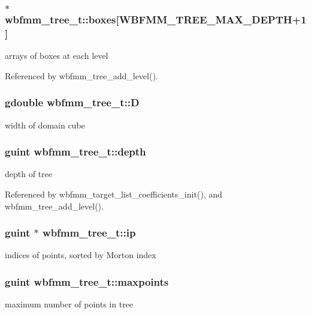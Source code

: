 \subsubsection[{boxes}]{$\ast$ wbfmm\+\_\+tree\+\_\+t\+::boxes[W\+B\+F\+M\+M\+\_\+\+T\+R\+E\+E\+\_\+\+M\+A\+X\+\_\+\+D\+E\+P\+T\+H+1]}\label{structwbfmm__tree__t_a2cec33cf396af727261fdb357e2a4de2}
arrays of boxes at each level 

Referenced by wbfmm\+\_\+tree\+\_\+add\+\_\+level().

\subsubsection[{D}]{\setlength{\rightskip}{0pt plus 5cm}gdouble wbfmm\+\_\+tree\+\_\+t\+::\+D}\label{structwbfmm__tree__t_a3f8ee26d3fe9c69bb5ba7583711c2175}
width of domain cube 
\subsubsection[{depth}]{\setlength{\rightskip}{0pt plus 5cm}guint wbfmm\+\_\+tree\+\_\+t\+::depth}\label{structwbfmm__tree__t_ad6a069db29489d75083169ca0bca9901}
depth of tree 

Referenced by wbfmm\+\_\+target\+\_\+list\+\_\+coefficients\+\_\+init(), and wbfmm\+\_\+tree\+\_\+add\+\_\+level().

\subsubsection[{ip}]{\setlength{\rightskip}{0pt plus 5cm}guint $\ast$ wbfmm\+\_\+tree\+\_\+t\+::ip}\label{structwbfmm__tree__t_ad1b0ef45823888a234d18840d655f8e0}
indices of points, sorted by Morton index 
\subsubsection[{maxpoints}]{\setlength{\rightskip}{0pt plus 5cm}guint wbfmm\+\_\+tree\+\_\+t\+::maxpoints}\label{structwbfmm__tree__t_a81074e586538485590e38b9bc9274326}
maximum number of points in tree 
